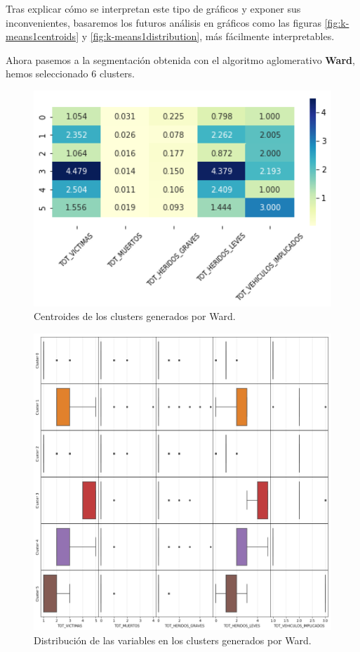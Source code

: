 \documentclass[oneside]{book}
\begin{document}
Tras explicar cómo se interpretan este tipo de gráficos y exponer sus
inconvenientes, basaremos los futuros análisis en gráficos como las
figuras \ref{fig:k-means1centroids} y \ref{fig:k-means1distribution},
más fácilmente interpretables.

Ahora pasemos a la segmentación obtenida con el algoritmo aglomerativo
\textbf{Ward}, hemos seleccionado 6 clusters.

\begin{figure}[H]
  \centering
  \includegraphics[width=120mm]{figures/accidentes/ward1centroids}
  \caption{Centroides de los clusters generados por Ward.}
  \label{fig:ward1centroids}
\end{figure}

\begin{figure}[H]
  \centering
  \includegraphics[width=120mm]{figures/accidentes/ward1distribution}
  \caption{Distribución de las variables en los clusters generados por
    Ward.}
  \label{fig:ward1distribution}
\end{figure}
\end{document}
